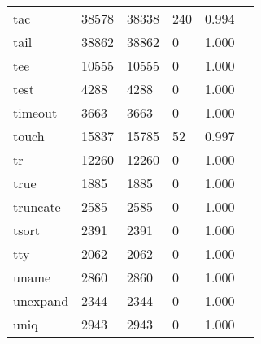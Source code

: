 \begin{longtable}{lp{2.4cm}p{2.4cm}p{2.4cm}p{2.4cm}p{2.4cm}}
tac       &                                   38578 &                       38338 &                          240 &                                   0.994 \\
tail      &                                   38862 &                       38862 &                            0 &                                   1.000 \\
tee       &                                   10555 &                       10555 &                            0 &                                   1.000 \\
test      &                                    4288 &                        4288 &                            0 &                                   1.000 \\
timeout   &                                    3663 &                        3663 &                            0 &                                   1.000 \\
touch     &                                   15837 &                       15785 &                           52 &                                   0.997 \\
tr        &                                   12260 &                       12260 &                            0 &                                   1.000 \\
true      &                                    1885 &                        1885 &                            0 &                                   1.000 \\
truncate  &                                    2585 &                        2585 &                            0 &                                   1.000 \\
tsort     &                                    2391 &                        2391 &                            0 &                                   1.000 \\
tty       &                                    2062 &                        2062 &                            0 &                                   1.000 \\
uname     &                                    2860 &                        2860 &                            0 &                                   1.000 \\
unexpand  &                                    2344 &                        2344 &                            0 &                                   1.000 \\
uniq      &                                    2943 &                        2943 &                            0 &                                   1.000 \\

\end{longtable}
